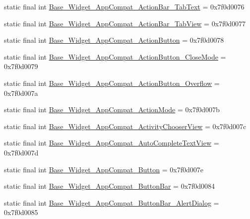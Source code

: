 \begin{DoxyCompactItemize}
\item 
static final int \mbox{\hyperlink{classcom_1_1google_1_1android_1_1gms_1_1R_1_1style_ae48c09b878f65ee97fd1af09ba337777}{Base\+\_\+\+Widget\+\_\+\+App\+Compat\+\_\+\+Action\+Bar\+\_\+\+Tab\+Text}} = 0x7f0d0076
\item 
static final int \mbox{\hyperlink{classcom_1_1google_1_1android_1_1gms_1_1R_1_1style_a3fad039de9a27d8f7279637f5f34dd74}{Base\+\_\+\+Widget\+\_\+\+App\+Compat\+\_\+\+Action\+Bar\+\_\+\+Tab\+View}} = 0x7f0d0077
\item 
static final int \mbox{\hyperlink{classcom_1_1google_1_1android_1_1gms_1_1R_1_1style_a05c56b9e7c99c1265b70c08a482ba0e2}{Base\+\_\+\+Widget\+\_\+\+App\+Compat\+\_\+\+Action\+Button}} = 0x7f0d0078
\item 
static final int \mbox{\hyperlink{classcom_1_1google_1_1android_1_1gms_1_1R_1_1style_a19b63605403798a1abbceaec9f1d7253}{Base\+\_\+\+Widget\+\_\+\+App\+Compat\+\_\+\+Action\+Button\+\_\+\+Close\+Mode}} = 0x7f0d0079
\item 
static final int \mbox{\hyperlink{classcom_1_1google_1_1android_1_1gms_1_1R_1_1style_a7a33f357e101945409e117eb6e4233b2}{Base\+\_\+\+Widget\+\_\+\+App\+Compat\+\_\+\+Action\+Button\+\_\+\+Overflow}} = 0x7f0d007a
\item 
static final int \mbox{\hyperlink{classcom_1_1google_1_1android_1_1gms_1_1R_1_1style_a8c9ef614ac7e4ee42fbc6951c498eba7}{Base\+\_\+\+Widget\+\_\+\+App\+Compat\+\_\+\+Action\+Mode}} = 0x7f0d007b
\item 
static final int \mbox{\hyperlink{classcom_1_1google_1_1android_1_1gms_1_1R_1_1style_ac4875a0724ef58b6ffd1336548fe9331}{Base\+\_\+\+Widget\+\_\+\+App\+Compat\+\_\+\+Activity\+Chooser\+View}} = 0x7f0d007c
\item 
static final int \mbox{\hyperlink{classcom_1_1google_1_1android_1_1gms_1_1R_1_1style_a1eb278ae1f2da8866be9e759bc9db37d}{Base\+\_\+\+Widget\+\_\+\+App\+Compat\+\_\+\+Auto\+Complete\+Text\+View}} = 0x7f0d007d
\item 
static final int \mbox{\hyperlink{classcom_1_1google_1_1android_1_1gms_1_1R_1_1style_a874684ad7bfa3cba6c7fbcd61a66207d}{Base\+\_\+\+Widget\+\_\+\+App\+Compat\+\_\+\+Button}} = 0x7f0d007e
\item 
static final int \mbox{\hyperlink{classcom_1_1google_1_1android_1_1gms_1_1R_1_1style_ab1f92c3928baeda28a8d73d37d7aff30}{Base\+\_\+\+Widget\+\_\+\+App\+Compat\+\_\+\+Button\+Bar}} = 0x7f0d0084
\item 
static final int \mbox{\hyperlink{classcom_1_1google_1_1android_1_1gms_1_1R_1_1style_aa0fa4793b181eae624d42d343afdb48c}{Base\+\_\+\+Widget\+\_\+\+App\+Compat\+\_\+\+Button\+Bar\+\_\+\+Alert\+Dialog}} = 0x7f0d0085

\end{DoxyCompactItemize}
